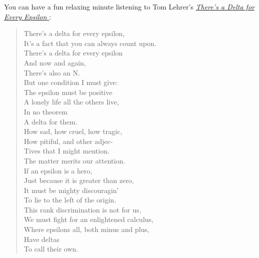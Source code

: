 \documentclass{article}
\begin{document}
You can have a fun relaxing minute listening to Tom Lehrer's \href{https://www.youtube.com/watch?v=zxFCQplZgKI#t=2m35s}{\textit{There's a Delta for Every Epsilon} \ExternalLink}:
\begin{quote}
There's a delta for every epsilon, \\
It's a fact that you can always count upon. \\
There's a delta for every epsilon \\
And now and again, \\
There's also an N. \\

But one condition I must give: \\
The epsilon must be positive \\
A lonely life all the others live, \\
In no theorem \\
A delta for them. \\

How sad, how cruel, how tragic, \\
How pitiful, and other adjec- \\
Tives that I might mention. \\
The matter merits our attention. \\
If an epsilon is a hero, \\
Just because it is greater than zero, \\
It must be mighty discouragin' \\
To lie to the left of the origin. \\

This rank discrimination is not for us, \\
We must fight for an enlightened calculus, \\
Where epsilons all, both minus and plus, \\
Have deltas \\
To call their own.
\end{quote}

\clearpage
\printindex

\end{document}
